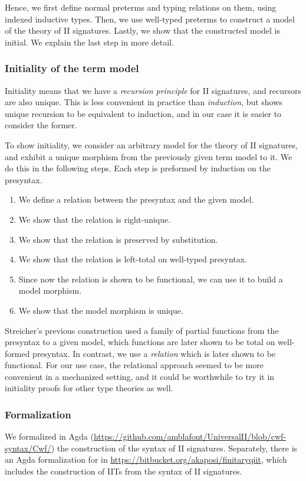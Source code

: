 Hence, we first define normal preterms and typing relations on them, using indexed
inductive types. Then, we use well-typed preterms to construct a model of the theory
of II signatures. Lastly, we show that the constructed model is initial. We explain
the last step in more detail.

\subsubsection*{Initiality of the term model}

Initiality means that we have a \emph{recursion principle} for II signatures,
and recursors are also unique. This is less convenient in practice than
\emph{induction}, but \cite{qiit} shows unique recursion to be equivalent to
induction, and in our case it is easier to consider the former.

To show initiality, we consider an arbitrary model for the theory of II
signatures, and exhibit a unique morphism from the previously given term model
to it. We do this in the following steps. Each step is preformed by induction on
the presyntax.

\begin{enumerate}
  \item We define a relation between the presyntax and the given model.
  \item We show that the relation is right-unique.
  \item We show that the relation is preserved by substitution.
  \item We show that the relation is left-total on well-typed presyntax.
  \item Since now the relation is shown to be functional, we can use it to
        build a model morphism.
  \item We show that the model morphism is unique.
\end{enumerate}

Streicher's previous construction \cite{streicher2012semantics} used a family of
partial functions from the presyntax to a given model, which functions are later
shown to be total on well-formed presyntax. In contrast, we use a
\emph{relation} which is later shown to be functional. For our use case, the
relational approach seemed to be more convenient in a mechanized setting, and it
could be worthwhile to try it in initiality proofs for other type theories as
well.

\subsubsection*{Formalization}
We formalized in Agda
(\url{https://github.com/amblafont/UniversalII/blob/cwf-syntax/Cwf/}) the
construction of the syntax of II signatures. Separately, there is an Agda
formalization for \cite{qiit} in
\url{https://bitbucket.org/akaposi/finitaryqiit}, which includes the
construction of IITs from the syntax of II signatures.

